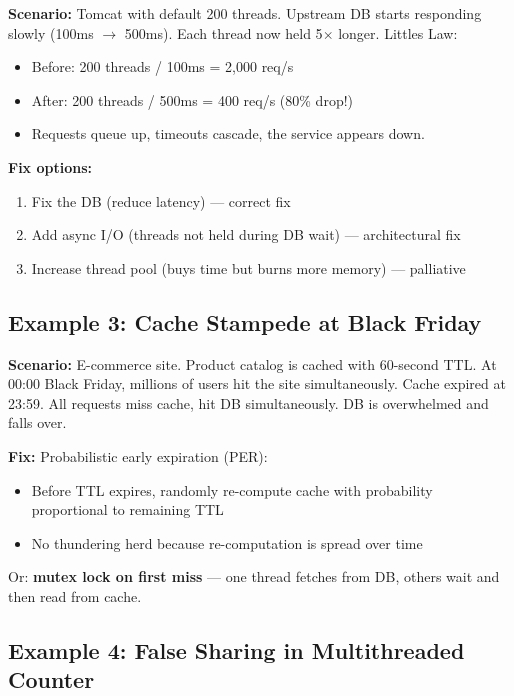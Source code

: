 \documentclass[11pt]{article}
\providecommand{\tightlist}{\setlength{\itemsep}{1pt}\setlength{\parskip}{0pt}}
\begin{document}
\textbf{Scenario:} Tomcat with default 200 threads. Upstream DB starts responding slowly (100ms \(\rightarrow\) 500ms). Each thread now held 5\(\times\) longer. Little\textquotesingle s Law:

\begin{itemize}
\tightlist
\item
  Before: 200 threads / 100ms = 2,000 req/s
\item
  After: 200 threads / 500ms = 400 req/s (80\% drop!)
\item
  Requests queue up, timeouts cascade, the service appears down.
\end{itemize}

\textbf{Fix options:}

\begin{enumerate}
\def\labelenumi{\arabic{enumi}.}
\tightlist
\item
  Fix the DB (reduce latency) --- correct fix
\item
  Add async I/O (threads not held during DB wait) --- architectural fix
\item
  Increase thread pool (buys time but burns more memory) --- palliative
\end{enumerate}

\subsection{Example 3: Cache Stampede at Black Friday}\label{example-3-cache-stampede-at-black-friday}

\textbf{Scenario:} E-commerce site. Product catalog is cached with 60-second TTL. At 00:00 Black Friday, millions of users hit the site simultaneously. Cache expired at 23:59. All requests miss cache, hit DB simultaneously. DB is overwhelmed and falls over.

\textbf{Fix:} Probabilistic early expiration (PER):

\begin{itemize}
\tightlist
\item
  Before TTL expires, randomly re-compute cache with probability proportional to remaining TTL
\item
  No thundering herd because re-computation is spread over time
\end{itemize}

Or: \textbf{mutex lock on first miss} --- one thread fetches from DB, others wait and then read from cache.

\subsection{Example 4: False Sharing in Multithreaded Counter}\label{example-4-false-sharing-in-multithreaded-counter}
\end{document}
